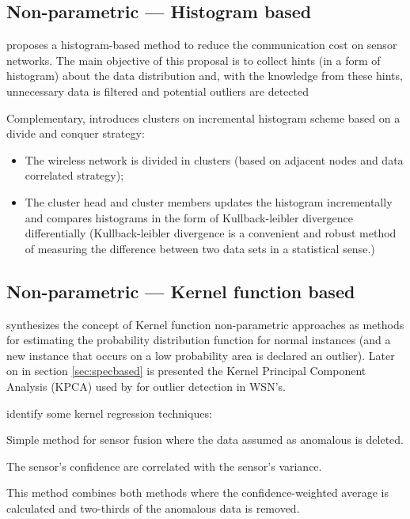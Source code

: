 \subsection{Non-parametric --- Histogram based}
\cite{stat:sheng:2007} proposes a histogram-based method to reduce the communication cost on sensor networks. The main objective of this proposal is to collect hints (in a form of histogram) about the data distribution and, with the knowledge from these hints, unnecessary data is filtered and potential outliers are detected 


Complementary, \cite{stat:wang:2013} introduces clusters on incremental histogram scheme based on a divide and conquer strategy:

\begin{itemize}
	\setlength\itemsep{-0.5em}
	\item The wireless network is divided in clusters (based on adjacent nodes and data correlated strategy);
	\item The cluster head and cluster members updates the histogram incrementally and compares histograms in the form of Kullback-leibler divergence differentially (Kullback-leibler divergence is a convenient and robust
	method of measuring the difference between two data sets in a
	statistical sense.)
\end{itemize}

\subsection{Non-parametric --- Kernel function based}
\cite{gen:zhang:2010} synthesizes the concept of Kernel function non-parametric approaches as methods for estimating the probability distribution function for normal instances (and a new instance that occurs on a low probability area is declared an outlier). Later on in section \ref{sec:specbased} is presented the Kernel Principal Component Analysis (KPCA) used by \cite{stat:ghorbel:2014} for outlier detection in WSN's.

\cite{cluster:andrade2016} identify some kernel regression techniques: 

\begin{description}
	\setlength\itemsep{-0.5em}
	\item[Marzullo's Fault Tolerant Sensor Averaging (FTA) ] 
	Simple method for sensor fusion where the data assumed as anomalous is deleted.
	\item[Elmenreich's Confidence-Weighted Averaging (CWA) ] 
	The sensor's confidence are correlated with the sensor's variance.
	\item[CWA+FTA method ]
	This method combines both methods where the confidence-weighted average is calculated and two-thirds of the anomalous data is removed.
\end{description}
